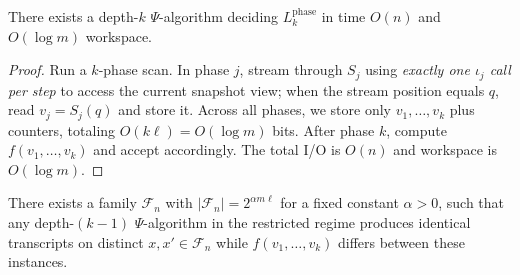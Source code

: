 \begin{theorem}[UB at depth $k$]
\label{Lkphase:thm:UB}
There exists a depth-$k$ $\Psi$-algorithm deciding $L_k^{\text{phase}}$ in time $O(n)$ and $O(\log m)$ workspace.
\end{theorem}

\begin{proof}
Run a $k$-phase scan. In phase $j$, stream through $S_j$ using \emph{exactly one $\iota_j$ call per step} to access the current snapshot view; when the stream position equals $q$, read $v_j=S_j(q)$ and store it. Across all phases, we store only $v_1,\ldots,v_k$ plus counters, totaling $O(k\ell)=O(\log m)$ bits. After phase $k$, compute $f(v_1,\ldots,v_k)$ and accept accordingly. The total I/O is $O(n)$ and workspace is $O(\log m)$.
\end{proof}

\begin{lemma}
\label{Lkphase:lem:transcript-collision}
There exists a family $\mathcal{F}_n$ with $\lvert\mathcal{F}_n\rvert=2^{\alpha m\ell}$ for a fixed constant $\alpha>0$, such that any depth-$(k{-}1)$ $\Psi$-algorithm in the restricted regime produces identical transcripts on distinct $x,x'\in\mathcal{F}_n$ while $f(v_1,\ldots,v_k)$ differs between these instances.
\end{lemma}

